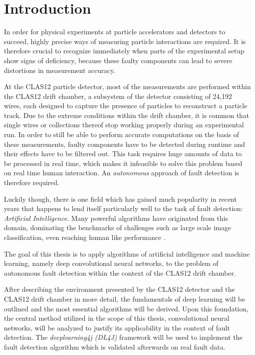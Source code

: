 \chapter{Introduction}

In order for physical experiments at particle accelerators and
detectors to succeed, highly precise ways
of measuring particle interactions are required. It is therefore
crucial to recognize immediately when parts of the experimental setup
show signs of deficiency, because these faulty components can lead to
severe distortions in measurement accuracy.

At the CLAS12 particle detector, most of the measurements are
performed within the CLAS12 drift chamber, a subsystem of the detector
consisting of 24,192 wires, each designed to capture the presence of
particles to reconstruct a particle track. Due to the extreme
conditions within the drift chamber, it
is common that single wires or collections thereof stop working
properly during an experimental run. In order to still be able to
perform accurate computations on the basis of these measurements,
faulty components have to be detected during runtime and their effects
have to be filtered out. This task requires huge amounts of data to be
processed in real time, which makes it infeasible to solve this
problem based on real time human interaction. An \textit{autonomous}
approach of fault detection is therefore required.

Luckily though, there is one field which has gained much popularity
in recent years that happens to lend itself particularly well to
the task of fault detection: \textit{Artificial
  Intelligence}. Many powerful algorithms have originated from this
domain, dominating the benchmarks of challenges such
as large scale image classification, even reaching human like
performance \cite{Russakovsky}.

The goal of this thesis is to apply algorithms of artificial
intelligence and machine learning, namely deep convolutional neural
networks, to the problem of autonomous fault detection within the
context of the CLAS12 drift chamber.

After describing the environment presented by the CLAS12 detector and
the CLAS12 drift chamber in more detail, the fundamentals of deep
learning will be outlined and the most essential algorithms will be
derived. Upon this foundation, the central method utilized in the
scope of this thesis, convolutional neural networks, will be analyzed
to justify its applicability in the context of fault detection. The
\textit{deeplearning4j (DL4J)} framework will be used to implement the
fault detection algorithm which is validated afterwards on real fault
data.
